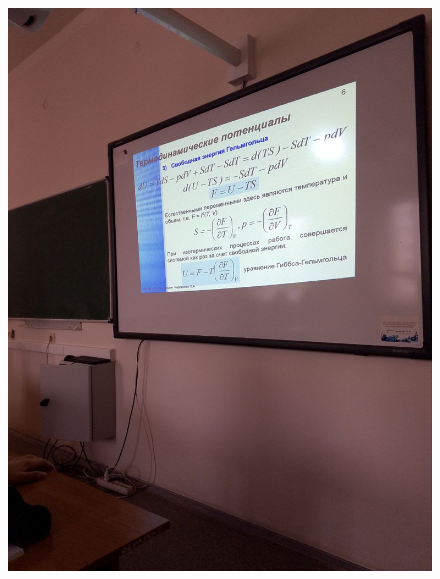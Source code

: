 \documentclass{article}
\begin{document}
\begin{figure}[H]
    \includegraphics[width=\textwidth]{5.jpg}
\end{figure}
\end{document}
